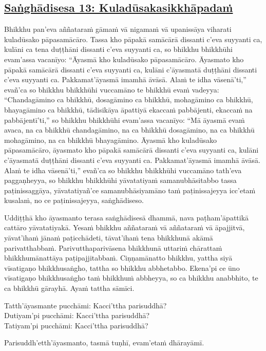 \subsection*{\hyperref[comm13]{Saṅghādisesa 13: Kuladūsakasikkhāpadaṁ}}
\label{sd13}
Bhikkhu pan'eva aññataraṁ gāmaṁ vā nigamaṁ vā upanissāya viharati kuladūsako pāpasamācāro. Tassa kho pāpakā samācārā dissanti c'eva suyyanti ca, kulāni ca tena duṭṭhāni dissanti c'eva suyyanti ca, so bhikkhu bhikkhūhi evam'assa vacanīyo: ``Āyasmā kho kuladūsako pāpasamācāro. Āyasmato kho pāpakā samācārā dissanti c'eva suyyanti ca, kulāni c'āyasmatā duṭṭhāni dissanti c'eva suyyanti ca. Pakkamat'āyasmā imamhā āvāsā. Alaṁ te idha vāsenā'ti,'' evañ'ca so bhikkhu bhikkhūhi vuccamāno te bhikkhū evaṁ vadeyya: ``Chandagāmino ca bhikkhū, dosagāmino ca bhikkhū, mohagāmino ca bhikkhū, bhayagāmino ca bhikkhū, tādisikāya āpattiyā ekaccaṁ pabbājenti, ekaccaṁ na pabbājentī'ti,'' so bhikkhu bhikkhūhi evam'assa vacanīyo: ``Mā āyasmā evaṁ avaca, na ca bhikkhū chandagāmino, na ca bhikkhū dosagāmino, na ca bhikkhū mohagāmino, na ca bhikkhū bhayagāmino. Āyasmā kho kuladūsako pāpasamācāro, āyasmato kho pāpakā samācārā dissanti c'eva suyyanti ca, kulāni c'āyasmatā duṭṭhāni dissanti c'eva suyyanti ca. Pakkamat'āyasmā imamhā āvāsā. Alaṁ te idha vāsenā'ti,'' evañ'ca so bhikkhu bhikkhūhi vuccamāno tath'eva paggaṇheyya, so bhikkhu bhikkhūhi yāvatatiyaṁ samanubhāsitabbo tassa paṭinissaggāya, yāvatatiyañ'ce samanubhāsiyamāno taṁ paṭinissajeyya icc'etaṁ kusalaṁ, no ce paṭinissajeyya, saṅghādiseso.

\medskip

\begin{center}
Uddiṭṭhā kho āyasmanto terasa saṅghādisesā dhammā, nava paṭham'āpattikā cattāro yāvatatiyakā. Yesaṁ bhikkhu aññataraṁ vā aññataraṁ vā āpajjitvā, yāvat'ihaṁ jānaṁ paṭicchādeti, tāvat'ihaṁ tena bhikkhunā akāmā parivatthabbaṁ. Parivutthaparivāsena bhikkhunā uttariṁ chārattaṁ bhikkhumānattāya paṭipajjitabbaṁ. Ciṇṇamānatto bhikkhu, yattha siyā vīsatigaṇo bhikkhusaṅgho, tattha so bhikkhu abbhetabbo. Ekena'pi ce ūno vīsatigaṇo bhikkhusaṅgho taṁ bhikkhuṁ abbheyya, so ca bhikkhu anabbhito, te ca bhikkhū gārayhā. Ayaṁ tattha sāmīci.

\smallskip

Tatth'āyasmante pucchāmi: Kacci'ttha parisuddhā?\\
Dutiyam'pi pucchāmi: Kacci'ttha parisuddhā?\\
Tatiyam'pi pucchāmi: Kacci'ttha parisuddhā?

\smallskip

Parisuddh'etth'āyasmanto, tasmā tuṇhī, evam'etaṁ dhārayāmī.
\end{center}

